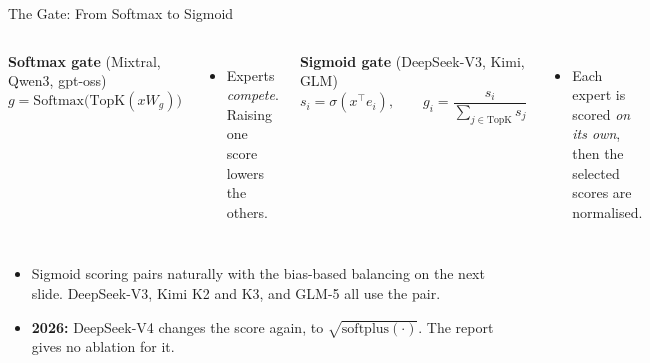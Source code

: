 \begin{frame}{The Gate: From Softmax to Sigmoid}
    \begin{columns}[T,onlytextwidth]
        \textbf{Softmax gate} (Mixtral, Qwen3, gpt-oss)
        \[
            g = \mathrm{Softmax}\big(\mathrm{TopK}(x W_g)\big)
        \]
        \begin{itemize}\itemsep0.3em
            \item Experts \emph{compete}. Raising one score lowers the others.
        \end{itemize}
        \textbf{Sigmoid gate} (DeepSeek-V3, Kimi, GLM)
        \[
            s_i=\sigma(x^\top e_i), \qquad g_i=\frac{s_i}{\sum_{j\in \mathrm{TopK}} s_j}
        \]
        \begin{itemize}\itemsep0.3em
            \item Each expert is scored \emph{on its own}, then the selected scores are normalised.
        \end{itemize}
    \end{columns}
    \vspace{0.6em}
    \begin{itemize}\itemsep0.45em
        \item Sigmoid scoring pairs naturally with the bias-based balancing on the next slide. DeepSeek-V3, Kimi K2 and K3, and GLM-5 all use the pair.
        \item \textbf{2026:} DeepSeek-V4 changes the score again, to $\sqrt{\mathrm{softplus}(\cdot)}$. The report gives no ablation for it.
    \end{itemize}
\end{frame}

